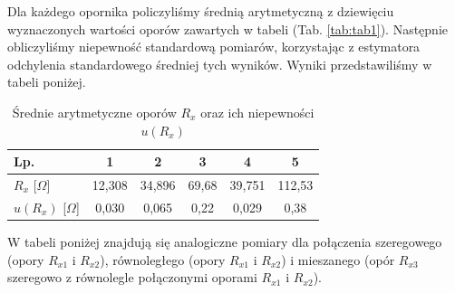 \documentclass[12pt,a4paper]{article}
\numberwithin{equation}{section}
\begin{document}
Dla każdego opornika policzyliśmy średnią arytmetyczną z dziewięciu wyznaczonych wartości oporów zawartych w tabeli (Tab. \ref{tab:tab1}). Następnie obliczyliśmy niepewność standardową pomiarów, korzystając z estymatora odchylenia standardowego średniej tych wyników. Wyniki przedstawiliśmy w tabeli poniżej.

\begin{table}[!ht]
	\caption{Średnie arytmetyczne oporów $R_x$ oraz ich niepewności $u(R_x)$}
	\begin{center}
		\begin{tabular}{l||c|c|c|c|c}
			\hline
			Lp. & 1 & 2 & 3 & 4 & 5 \\ \hline
			$R_x$ [$\Omega$] & 12,308 & 34,896 & 69,68 & 39,751 & 112,53  \\
			$u(R_{x})$ [$\Omega$] & 0,030 & 0,065 & 0,22 & 0,029 & 0,38 \\ \hline
		\end{tabular}
	\end{center}
	\label{tab:tab2}
\end{table}

W tabeli poniżej znajdują się analogiczne pomiary dla połączenia szeregowego (opory $R_{x1}$ i $R_{x2}$), równoległego (opory $R_{x1}$ i $R_{x2}$) i mieszanego (opór $R_{x3}$ szeregowo z równolegle połączonymi oporami $R_{x1}$ i $R_{x2}$).
\end{document}
